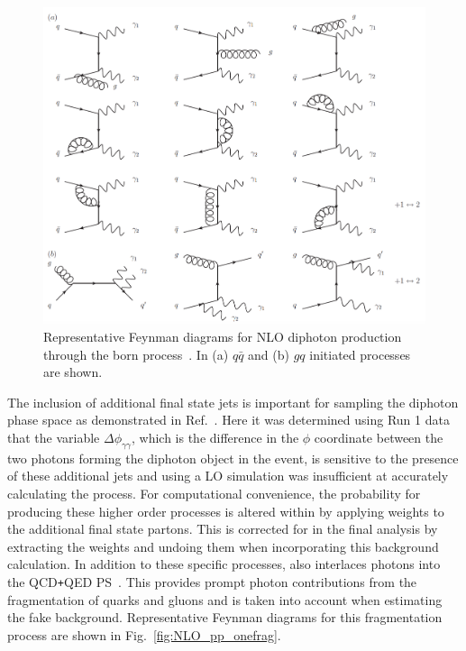\begin{figure}[hbt!]
  \centering
  \includegraphics[scale=0.55]{figures/born_nlo}
  \caption{Representative Feynman diagrams for NLO diphoton production through the born process~\cite{DErrico:2011cgc}. In (a) $q\bar{q}$ and (b) $gq$ initiated processes are shown.}
  \label{fig:NLO_pp}
\end{figure}

The inclusion of additional final state jets is important for sampling the diphoton phase space as demonstrated in Ref.~\cite{CMS-PAS-EXO-12-045}. Here it was determined using Run 1 data that the variable $\Delta\phi_{\gamma\gamma}$, which is the difference in the $\phi$ coordinate between the two photons forming the diphoton object in the event, is sensitive to the presence of these additional jets and using a LO simulation was insufficient at accurately calculating the process. For computational convenience, the probability for producing these higher order processes is altered within \SHERPA by applying weights to the additional final state partons. This is corrected for in the final analysis by extracting the weights and undoing them when incorporating this background calculation. In addition to these specific processes, \SHERPA also interlaces photons into the QCD\texttt{+}QED PS~\cite{Hoeche:2009xc}. This provides prompt photon contributions from the fragmentation of quarks and gluons and is taken into account when estimating the fake background. Representative Feynman diagrams for this fragmentation process are shown in Fig.~\ref{fig:NLO_pp_onefrag}.

